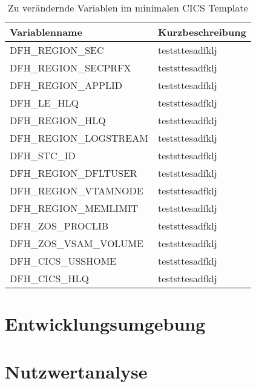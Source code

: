 \begin{table}
\centering
\begin{tabular}[h]{l|l}
Variablenname & Kurzbeschreibung \\
\hline
DFH\_REGION\_SEC & teststtesadfklj \\
DFH\_REGION\_SECPRFX & teststtesadfklj \\
DFH\_REGION\_APPLID & teststtesadfklj \\
DFH\_LE\_HLQ & teststtesadfklj \\
DFH\_REGION\_HLQ & teststtesadfklj \\
DFH\_REGION\_LOGSTREAM & teststtesadfklj \\
DFH\_STC\_ID & teststtesadfklj \\
DFH\_REGION\_DFLTUSER & teststtesadfklj \\
DFH\_REGION\_VTAMNODE & teststtesadfklj \\
DFH\_REGION\_MEMLIMIT & teststtesadfklj \\
DFH\_ZOS\_PROCLIB & teststtesadfklj \\
DFH\_ZOS\_VSAM\_VOLUME & teststtesadfklj \\
DFH\_CICS\_USSHOME & teststtesadfklj \\
DFH\_CICS\_HLQ & teststtesadfklj \\
\end{tabular}
\caption{Zu verändernde Variablen im minimalen CICS Template}
\label{tab:cgsvars}
\end{table}




\section{Entwicklungsumgebung}

\section{Nutzwertanalyse}
